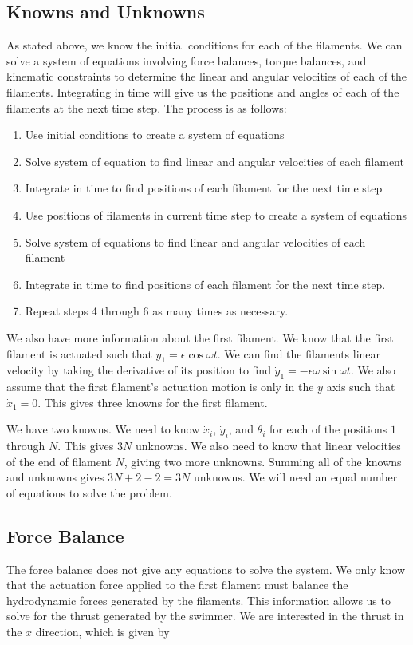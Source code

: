 \documentclass[12pt,letterpaper,titlepage]{article}
\begin{document}
\subsection{Knowns and Unknowns}
As stated above, we know the initial conditions for each of the filaments. We can solve a system of equations involving force balances, torque balances, and kinematic constraints to determine the linear and angular velocities of each of the filaments. Integrating in time will give us the positions and angles of each of the filaments at the next time step. The process is as follows:
\begin{enumerate} \itemsep -2pt
\item Use initial conditions to create a system of equations
\item Solve system of equation to find linear and angular velocities of each filament
\item Integrate in time to find positions of each filament for the next time step
\item Use positions of filaments in current time step to create a system of equations
\item Solve system of equations to find linear and angular velocities of each filament
\item Integrate in time to find positions of each filament for the next time step.
\item Repeat steps 4 through 6 as many times as necessary.
\end{enumerate}

We also have more information about the first filament. We know that the first filament is actuated such that $y_1 = \epsilon \cos \omega t$. We can find the filaments linear velocity by taking the derivative of its position to find $\dot{y}_1 = - \epsilon \omega \sin \omega t$. We also assume that the first filament's actuation motion is only in the $y$ axis such that $\dot{x}_1 = 0$. This gives three knowns for the first filament.

\newpage

We have two knowns. We need to know $\dot{x}_i$, $\dot{y}_i$, and $\dot{\theta}_i$ for each of the positions $1$ through $N$. This gives $3N$ unknowns. We also need to know that linear velocities of the end of filament $N$, giving two more unknowns. Summing all of the knowns and unknowns gives $3N + 2 - 2 = 3N$ unknowns. We will need an equal number of equations to solve the problem.

\subsection{Force Balance}
The force balance does not give any equations to solve the system. We only know that the actuation force applied to the first filament must balance the hydrodynamic forces generated by the filaments. This information allows us to solve for the thrust generated by the swimmer. We are interested in the thrust in the $x$ direction, which is given by
\end{document}

